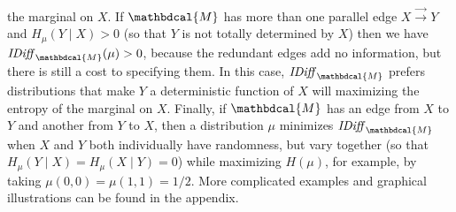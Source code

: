 \documentclass{article}
\theoremstyle{plain}
\theoremstyle{definition}
\theoremstyle{remark}
\newcommand{\dg}[1]{\mathbdcal{#1}}
\newcommand{\IBal}[1]{\mathit{IDiff}_{#1}}
\numberwithin{equation}{section}
\begin{document}
the marginal on $X$.
If $\dg M$ has  
more than one parallel edge $X \stackrel{\to}{\to} Y$
and $H_{\mu}(Y \mid X) 
> 0$ 
(so that $Y$ is not totally determined by $X$)
then we have $\IBal{\dg M}(\mu) > 0$, because the redundant edges add no
information, but there is still a cost to specifying them.
In this case, $\IBal{\dg M}$ prefers distributions that make $Y$ a
deterministic function of $X$ will maximizing the entropy of the
marginal on $X$.
Finally, if ${\dg M}$ has an edge from $X$ to $Y$ and another from $Y$
to $X$, then 
a distribution $\mu$ minimizes
$\IBal{\dg M}$ when 
$X$ and $Y$ both individually have randomness, but vary together
(so that $H_\mu(Y \mid X) = H_\mu(X \mid Y) = 0$) while
maximizing $H(\mu)$, for example, by taking $\mu(0,0) = \mu(1,1) = 1/2$.
More complicated examples and graphical illustrations can be found in the appendix.
\end{document}
